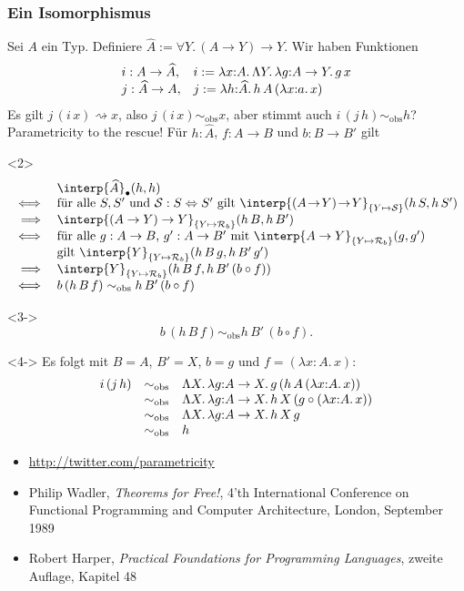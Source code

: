 \documentclass{beamer}
\newcommand{\defeq}{:=} %
\newcommand{\fa}[1]{\forall {#1}.\,}
\newcommand{\lam}[1]{\lambda #1.\,}
\newcommand{\Lam}[1]{\Lambda #1.\,}
\newcommand{\emptyCtx}{\bullet}
\newcommand{\reducesTo}{\mathbin{\rightsquigarrow}} %
\newcommand{\obs}{\sim_\mathrm{obs}} %
\newcommand{\relInterp}[2]{\interp{#2}_{#1}}
\newcommand{\Rel}[3]{#1 : #2 \Leftrightarrow #3}
\newcommand{\funRel}[1]{\mathcal{R}_{#1}}
\begin{document}
\begin{frame}[t]
  \frametitle{Ein Isomorphismus}
  Sei $A$ ein Typ. Definiere $\widehat{A} \defeq \fa{Y} (A \to Y) \to Y$.
  Wir haben Funktionen
  \[\begin{array}{l l}
    i : A \to \widehat{A}, & i \defeq \lam{x{:}A} \Lam{Y} \lam{g{:}A \to Y} g\,x \\
    j : \widehat{A} \to A, & j \defeq \lam{h{:}\widehat{A}} h\,A\,(\lam{x{:}a} x)
  \end{array}\]
  Es gilt $j\,(i\,x) \reducesTo x$, also $j\,(i\,x) \obs x$, aber stimmt auch $i\,(j\,h) \obs h$?
  Parametricity to the rescue!
  Für $h : \widehat{A}$, $f : A \to B$ und $b : B \to B'$ gilt
  \begin{onlyenv}<2>
  \[\begin{array}{r l}
    & \relInterp{\emptyCtx}{\widehat{A}}(h, h) \\
    \iff & \text{für alle $S, S'$ und $\Rel{\mathcal{S}}{S}{S'}$ gilt $\relInterp{\{ Y \mapsto \mathcal{S} \}}{(A \!\to\! Y) \!\to\! Y}(h\,S, h\,S')$} \\
    \implies & \relInterp{\{ Y \mapsto \funRel{b} \}}{(A \to Y) \to Y}(h\,B, h\,B') \\
    \iff & \text{für alle $g : A \to B$, $g' : A \to B'$ mit $\relInterp{\{ Y \mapsto \funRel{b} \}}{A \to Y}(g, g')$} \\
    & \text{gilt $\relInterp{\{ Y \mapsto \funRel{b} \}}{Y}(h\,B\,g, h\,B'\,g')$} \\
    \implies & \text{$\relInterp{\{ Y \mapsto \funRel{b} \}}{Y}(h\,B\,f, h\,B'\,(b \circ f))$} \\
    \iff & b\,(h\,B\,f) \obs h\,B'\,(b \circ f)
  \end{array}\]
  \end{onlyenv}
  \begin{onlyenv}<3->
    \[ b\,(h\,B\,f) \obs h\,B'\,(b \circ f). \]
  \end{onlyenv}
  \begin{onlyenv}<4->
  Es folgt mit $B = A$, $B' = X$, $b = g$ und $f = (\lam{x{:}A} x)$:
  \[\begin{array}{r c l}
    i\,(j\,h) &\obs& \Lam{X} \lam{g{:}A \to X} g\,(h\,A\,(\lam{x{:}A} x)) \\
    &\obs& \Lam{X} \lam{g{:}A \to X} h\,X\,(g \circ (\lam{x{:}A} x)) \\
    &\obs& \Lam{X} \lam{g{:}A \to X} h\,X\,g \\
    &\obs& h
  \end{array}\]
  \end{onlyenv}
\end{frame}

\begin{frame}
  \begin{itemize}
    \item \url{http://twitter.com/parametricity}
    \item Philip Wadler, \textit{Theorems for Free!}, 4'th International Conference on Functional Programming and Computer Architecture, London, September 1989
    \item Robert Harper, \textit{Practical Foundations for Programming Languages}, zweite Auflage, Kapitel 48
  \end{itemize}
\end{frame}
\end{document}
